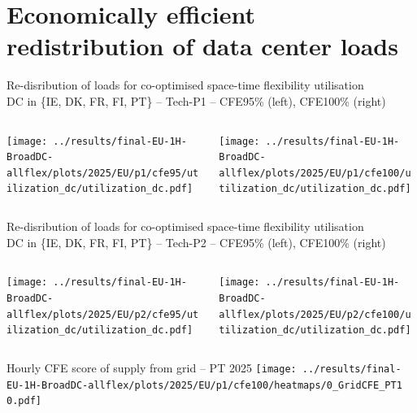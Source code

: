 \section*{Economically efficient redistribution of data center loads}


\begin{frame}{Re-disribution of loads for co-optimised space-time flexibility utilisation \\
  DC in \{IE, DK, FR, FI, PT\} -- Tech-P1 -- CFE95\% (left), CFE100\% (right)}

  \begin{columns}[T]
  \begin{column}{6cm}
    \centering
    \texttt{[image: ../results/final-EU-1H-BroadDC-allflex/plots/2025/EU/p1/cfe95/utilization\_dc/utilization\_dc.pdf]}
  \end{column}

  \begin{column}{6cm}
    \centering
    \texttt{[image: ../results/final-EU-1H-BroadDC-allflex/plots/2025/EU/p1/cfe100/utilization\_dc/utilization\_dc.pdf]}  
  \end{column}
  \end{columns}

\end{frame}


\begin{frame}{Re-disribution of loads for co-optimised space-time flexibility utilisation \\
  DC in \{IE, DK, FR, FI, PT\} -- Tech-P2 -- CFE95\% (left), CFE100\% (right)}

  \begin{columns}[T]
  \begin{column}{6cm}
    \centering
    \texttt{[image: ../results/final-EU-1H-BroadDC-allflex/plots/2025/EU/p2/cfe95/utilization\_dc/utilization\_dc.pdf]}
  \end{column}

  \begin{column}{6cm}
    \centering
    \texttt{[image: ../results/final-EU-1H-BroadDC-allflex/plots/2025/EU/p2/cfe100/utilization\_dc/utilization\_dc.pdf]}  
  \end{column}
  \end{columns}

\end{frame}



\begin{frame}{Hourly CFE score of supply from grid -- PT 2025}
  \vspace{.5cm}
  \texttt{[image: ../results/final-EU-1H-BroadDC-allflex/plots/2025/EU/p1/cfe100/heatmaps/0\_GridCFE\_PT1 0.pdf]}
\end{frame}


